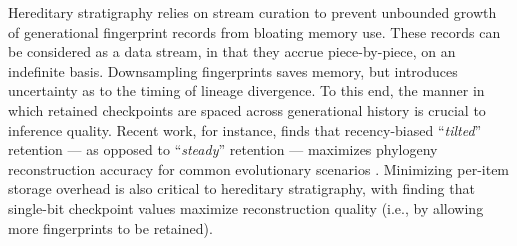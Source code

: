 Hereditary stratigraphy relies on stream curation to prevent unbounded growth of generational fingerprint records from bloating memory use.
These records can be considered as a data stream, in that they accrue piece-by-piece, on an indefinite basis.
Downsampling fingerprints saves memory, but introduces uncertainty as to the timing of lineage divergence.
To this end, the manner in which retained checkpoints are spaced across generational history is crucial to inference quality.
Recent work, for instance, finds that recency-biased ``\textit{tilted}'' retention --- as opposed to ``\textit{steady}'' retention --- maximizes phylogeny reconstruction accuracy for common evolutionary scenarios \citep{moreno2024guide}.
Minimizing per-item storage overhead is also critical to hereditary stratigraphy, with \citet{moreno2024guide} finding that single-bit checkpoint values maximize reconstruction quality (i.e., by allowing more fingerprints to be retained).
